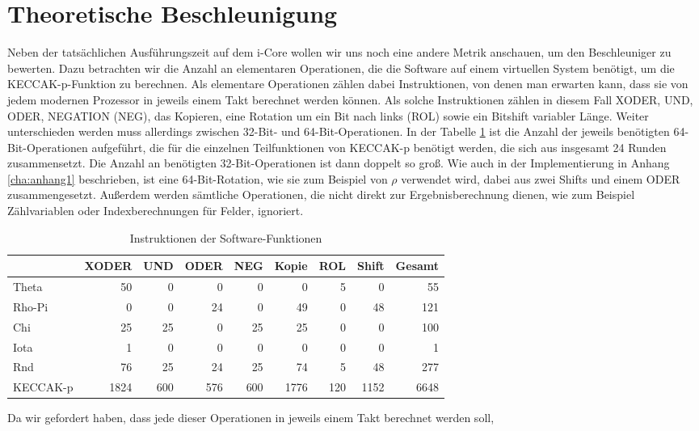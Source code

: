 \section{Theoretische Beschleunigung}
Neben der tatsächlichen Ausführungszeit auf dem i-Core wollen wir uns noch eine andere Metrik anschauen, um den Beschleuniger zu bewerten.
Dazu betrachten wir die Anzahl an elementaren Operationen, die die Software auf einem virtuellen System benötigt, um die KECCAK-p-Funktion zu berechnen.
Als elementare Operationen zählen dabei Instruktionen, von denen man erwarten kann, dass sie von jedem modernen Prozessor in jeweils einem Takt berechnet werden können.
Als solche Instruktionen zählen in diesem Fall XODER, UND, ODER, NEGATION (NEG), das Kopieren, eine Rotation um ein Bit nach links (ROL) sowie ein Bitshift variabler Länge.
Weiter unterschieden werden muss allerdings zwischen 32-Bit- und 64-Bit-Operationen. In der Tabelle \ref{tab:software_instruktionen} ist
die Anzahl der jeweils benötigten 64-Bit-Operationen aufgeführt, die für die einzelnen Teilfunktionen von KECCAK-p benötigt werden, die sich aus insgesamt 24 Runden zusammensetzt.
Die Anzahl an benötigten 32-Bit-Operationen ist dann doppelt so groß. Wie auch in der Implementierung in Anhang \ref{cha:anhang1} beschrieben, ist eine 64-Bit-Rotation,
wie sie zum Beispiel von $\rho$ verwendet wird, dabei aus zwei Shifts und einem ODER zusammengesetzt.
Außerdem werden sämtliche Operationen, die nicht direkt zur Ergebnisberechnung dienen,
wie zum Beispiel Zählvariablen oder Indexberechnungen für Felder, ignoriert.
\begin{table}
    \centering
    \begin{tabular}{lrrrrrrrr}
        & XODER & UND & ODER & NEG & Kopie & ROL & Shift & Gesamt \\
        \hline
        Theta & 50 & 0 & 0 & 0 & 0 & 5 & 0 & 55 \\
        Rho-Pi & 0 & 0 & 24 & 0 & 49 & 0 & 48 & 121 \\
        Chi & 25 & 25 & 0 & 25 & 25 & 0 & 0 & 100 \\
        Iota & 1 & 0 & 0 & 0 & 0 & 0 & 0 & 1 \\
        Rnd & 76 & 25 & 24 & 25 & 74 & 5 & 48 & 277\\
        KECCAK-p & 1824 & 600 & 576 & 600 & 1776 & 120 & 1152 & 6648
    \end{tabular}
    \label{tab:software_instruktionen}
    \caption{Instruktionen der Software-Funktionen}
\end{table}
Da wir gefordert haben, dass jede dieser Operationen in jeweils einem Takt berechnet werden soll,
